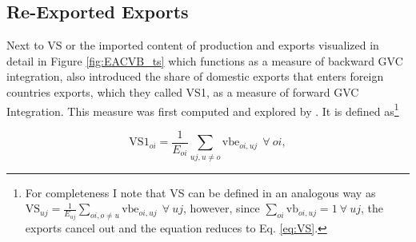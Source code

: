 \documentclass[a4paper]{article}
\begin{document}





\subsection{Re-Exported Exports}


Next to VS or the imported content of production and exports visualized in detail in Figure \ref{fig:EACVB_ts} which functions as a measure of backward GVC integration, \citet{hummels2001nature} also introduced the share of domestic exports that enters foreign countries exports, which they called VS1, as a measure of forward GVC Integration. This measure was first computed and explored by \citet{daudin2011produces}. It is defined as\footnote{For completeness I note that VS can be defined in an analogous way as $\text{VS}_{uj} = \frac{1}{E_{uj}} \sum_{oi, o \neq  u} \text{vbe}_{oi, uj}\ \ \forall\ uj$, however, since $\sum_{oi} \text{vb}_{oi, uj} = 1\ \forall\ uj$, the exports cancel out and the equation reduces to Eq. \ref{eq:VS}.

} 

\begin{equation} \label{eq:VS1}
\text{VS1}_{oi} = \frac{1}{E_{oi}} \sum_{uj, u \neq  o} \text{vbe}_{oi, uj}\ \ \forall\ oi,
\end{equation}
\end{document}
